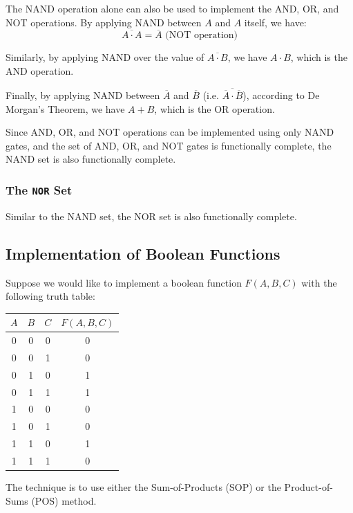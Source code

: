The NAND operation alone can also be used to implement the AND, OR, and NOT operations.
By applying NAND between $A$ and $A$ itself, we have:
\begin{equation*}
    \overline{A\cdot A} = \overline{A} \text{ (NOT operation)}
\end{equation*}

Similarly, by applying NAND over the value of $\overline{A\cdot B}$, we have $A\cdot B$,
which is the AND operation.

Finally, by applying NAND between $\overline{A}$ and $\overline{B}$
(i.e. $\overline{\overline{A}\cdot\overline{B}}$), according to
De Morgan's Theorem, we have $A+B$, which is the OR operation.

Since AND, OR, and NOT operations can be implemented using only NAND gates,
and the set of AND, OR, and NOT gates is functionally complete, the NAND set is also
functionally complete.

\subsubsection{The \texttt{NOR} Set}

Similar to the NAND set, the NOR set is also functionally complete.

\subsection{Implementation of Boolean Functions}

Suppose we would like to implement a boolean function $F(A, B, C)$ with the following
truth table:

\begin{table}[h]
\centering
\begin{tabular}{|c|c|c||c|}
    \hline
    $A$ & $B$ & $C$ & $F(A, B, C)$ \\
    \hline
    0 & 0 & 0 & 0 \\
    0 & 0 & 1 & 0 \\
    0 & 1 & 0 & 1 \\
    0 & 1 & 1 & 1 \\
    1 & 0 & 0 & 0 \\
    1 & 0 & 1 & 0 \\
    1 & 1 & 0 & 1 \\
    1 & 1 & 1 & 0 \\
    \hline
\end{tabular}
\end{table}
The technique is to use either the Sum-of-Products (SOP) or the Product-of-Sums (POS) method.

